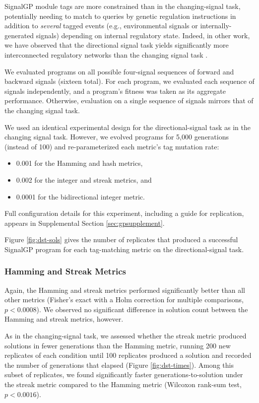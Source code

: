 SignalGP module tags are more constrained than in the changing-signal task, potentially needing to match to queries by genetic regulation instructions in addition to \textit{several} tagged events (e.g., environmental signals or internally-generated signals) depending on internal regulatory state.
Indeed, in other work, we have observed that the directional signal task yields significantly more interconnected regulatory networks than the changing signal task \citep{lalejini_tag-based_2021}.

We evaluated programs on all possible four-signal sequences of forward and backward signals (sixteen total).
For each program, we evaluated each sequence of signals independently, and a program's fitness was taken as its aggregate performance.
Otherwise, evaluation on a single sequence of signals mirrors that of the changing signal task.

We used an identical experimental design for the directional-signal task as in the changing signal task.
However, we evolved programs for 5,000 generations (instead of 100) and re-parameterized each metric's tag mutation rate:
\begin{itemize}
\item 0.001 for the Hamming and hash metrics,
\item 0.002 for the integer and streak metrics, and
\item 0.0001 for the bidirectional integer metric.
\end{itemize}
Full configuration details for this experiment, including a guide for replication, appears in Supplemental Section \ref{sec:gpsupplement}.

Figure \ref{fig:dst-sols} gives the number of replicates that produced a successful SignalGP program for each tag-matching metric on the directional-signal task.

\subsubsection{Hamming and Streak Metrics}

Again, the Hamming and streak metrics performed significantly better than all other metrics (Fisher's exact with a Holm correction for multiple comparisons, $p < 0.0008$).
We observed no significant difference in solution count between the Hamming and streak metrics, however.

As in the changing-signal task, we assessed whether the streak metric produced solutions in fewer generations than the Hamming metric, running 200 new replicates of each condition until 100 replicates produced a solution and recorded the number of generations that elapsed (Figure \ref{fig:dst-times}).
Among this subset of replicates, we found significantly faster generations-to-solution under the streak metric compared to the Hamming metric (Wilcoxon rank-sum test, $p < 0.0016$).

